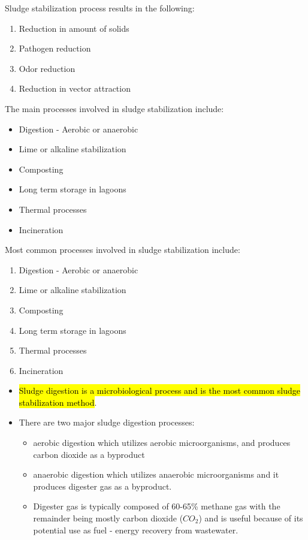 Sludge stabilization process results in the following:
\begin{enumerate}
\item Reduction in amount of solids
\item Pathogen reduction
\item Odor reduction
\item Reduction in vector attraction
\end{enumerate}
The main processes involved in sludge stabilization include:
\begin{itemize}
\item Digestion - Aerobic or anaerobic
\item Lime or alkaline stabilization
\item Composting
\item Long term storage in lagoons
\item Thermal processes
\item Incineration
\end{itemize}

Most common processes involved in sludge stabilization include:

		\begin{enumerate}
		\item Digestion - Aerobic or anaerobic
		\item Lime or alkaline stabilization
		\item Composting
		\item Long term storage in lagoons
		\item Thermal processes
		\item Incineration
		\end{enumerate}
		\begin{itemize}
		\item \hl{Sludge digestion is a microbiological process and is the most common sludge stabilization method}.
		\item There are two major sludge digestion processes:
			\begin{itemize}
			\item aerobic digestion which utilizes aerobic microorganisms, and produces carbon dioxide as a byproduct
			\item anaerobic digestion which utilizes anaerobic microorganisms and it produces digester gas as a byproduct.
			\item Digester gas is typically composed of 60-65\% methane gas with the remainder being mostly carbon dioxide ($CO_2$) and is useful because of its potential use as fuel - energy recovery from wastewater.
			\end{itemize}
		\end{itemize}

